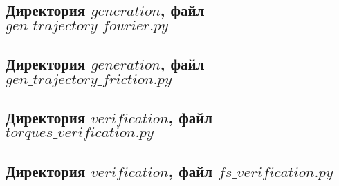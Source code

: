 \documentclass[codelisting]{../espd}
\begin{document}
{\subsection{Директория $generation$, файл $gen\_trajectory\_fourier.py$}


\subsection{Директория $generation$, файл $gen\_trajectory\_friction.py$}


\subsection{Директория $verification$, файл $torques\_verification.py$}


\subsection{Директория $verification$, файл $fs\_verification.py$}



% 

% 

% 

% 
%
\cleardoublepage
{}

%
% 
%
% 
% 
%
\registrationlistESPD
}
\end{document}
